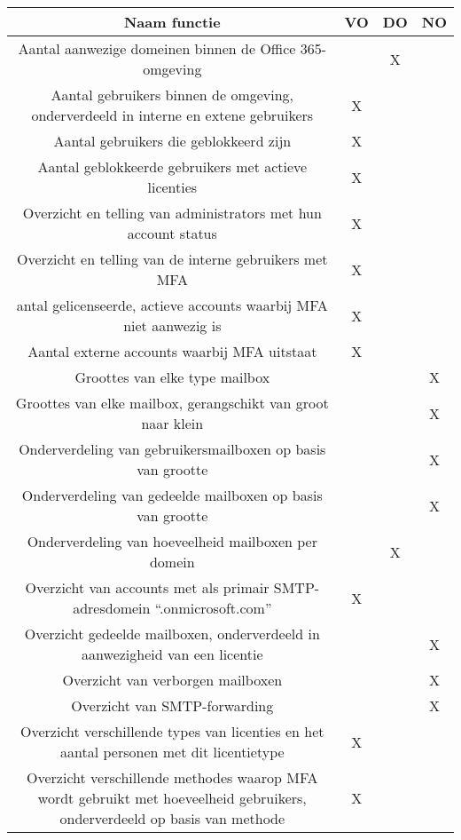 \begin{table}
    \centering
    \begin{adjustbox}{max width=\textwidth}
        \begin{tabular}{ |c||c|c|c| } 
            \hline
            \textbf{Naam functie} & \textbf{VO} & \textbf{DO} & \textbf{NO} \\
            \hline
            Aantal aanwezige domeinen binnen de Office 365-omgeving &  & X & \\
            Aantal gebruikers binnen de omgeving, onderverdeeld in interne en extene gebruikers & X &  & \\
            Aantal gebruikers die geblokkeerd zijn & X & & \\
            Aantal geblokkeerde gebruikers met actieve licenties & X & & \\
            Overzicht en telling van administrators met hun account status & X & & \\
            Overzicht en telling van de interne gebruikers met MFA & X & & \\
            antal gelicenseerde, actieve accounts waarbij MFA niet aanwezig is & X & & \\
            Aantal externe accounts waarbij MFA uitstaat & X & &  \\
            Groottes van elke type mailbox & & & X \\
            Groottes van elke mailbox, gerangschikt van groot naar klein & & & X \\ 
            Onderverdeling van gebruikersmailboxen op basis van grootte & & & X \\ 
            Onderverdeling van gedeelde mailboxen op basis van grootte & & & X \\ 
            Onderverdeling van hoeveelheid mailboxen per domein & & X & \\ 
            Overzicht van accounts met als primair SMTP-adresdomein “.onmicrosoft.com” & X & & \\
            Overzicht gedeelde mailboxen, onderverdeeld in aanwezigheid van een licentie & & & X \\ 
            Overzicht van verborgen mailboxen & & & X \\ 
            Overzicht van SMTP-forwarding & & & X \\ 
            Overzicht verschillende types van licenties en het
            aantal personen met dit licentietype & X & & \\ 
            Overzicht verschillende methodes waarop MFA wordt gebruikt met hoeveelheid gebruikers, onderverdeeld op basis van methode & X & & \\ 
            \hline
        \end{tabular}
    \end{adjustbox}
    \caption[]{}
    \label{POC}
\end{table}

